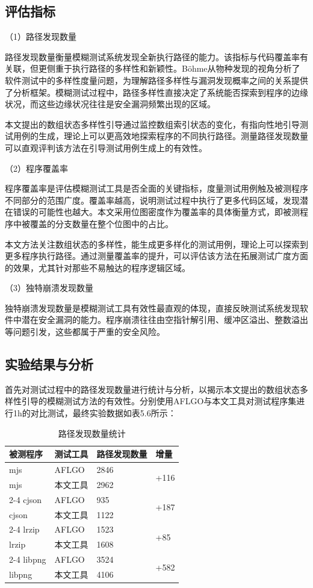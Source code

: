 \documentclass[bachelor]{njupthesis}
\begin{document}
\subsection{评估指标}

（1）路径发现数量

路径发现数量衡量模糊测试系统发现全新执行路径的能力。该指标与代码覆盖率有关联，但更侧重于执行路径的多样性和新颖性。Böhme\cite{STADS}从物种发现的视角分析了软件测试中的多样性度量问题，为理解路径多样性与漏洞发现概率之间的关系提供了分析框架。模糊测试过程中，路径多样性直接决定了系统能否探索到程序的边缘状况，而这些边缘状况往往是安全漏洞频繁出现的区域。

本文提出的数组状态多样性引导通过监控数组索引状态的变化，有指向性地引导测试用例的生成，理论上可以更高效地探索程序的不同执行路径。测量路径发现数量可以直观评判该方法在引导测试用例生成上的有效性。

（2）程序覆盖率

程序覆盖率是评估模糊测试工具是否全面的关键指标，度量测试用例触及被测程序不同部分的范围广度。覆盖率越高，说明测试过程中执行了更多代码区域，发现潜在错误的可能性也越大。本文采用位图密度作为覆盖率的具体衡量方式，即被测程序中被覆盖的分支数量在整个位图中的占比。

本文方法关注数组状态的多样性，能生成更多样化的测试用例，理论上可以探索到更多程序执行路径。通过测量覆盖率的提升，可以评估该方法在拓展测试广度方面的效果，尤其针对那些不易触达的程序逻辑区域。

（3）独特崩溃发现数量

独特崩溃发现数量是模糊测试工具有效性最直观的体现，直接反映测试系统发现软件中潜在安全漏洞的能力。程序崩溃往往由空指针解引用、缓冲区溢出、整数溢出等问题引发，这些都属于严重的安全风险。

\subsection{实验结果与分析}

首先对测试过程中的路径发现数量进行统计与分析，以揭示本文提出的数组状态多样性引导的模糊测试方法的有效性。分别使用AFLGO与本文工具对测试程序集进行1h的对比测试，最终实验数据如表5.6所示：

\begin{table}[hbt]
\centering
\caption{路径发现数量统计}
\label{tab:paths}
\begin{tabular}{llll}
\toprule
\textbf{被测程序} & \textbf{测试工具} & \textbf{路径发现数量} & \textbf{增量} \\
\midrule
mjs & AFLGO & 2846 & \multirow{2}{*}{+116} \\
mjs & 本文工具 & 2962 & \\
\cmidrule(lr){2-4}
cjson & AFLGO & 935 & \multirow{2}{*}{+187} \\
cjson & 本文工具 & 1122 & \\
\cmidrule(lr){2-4}
lrzip & AFLGO & 1523 & \multirow{2}{*}{+85} \\
lrzip & 本文工具 & 1608 & \\
\cmidrule(lr){2-4}
libpng & AFLGO & 3524 & \multirow{2}{*}{+582} \\
libpng & 本文工具 & 4106 & \\
\bottomrule
\end{tabular}
\end{table}
\end{document}
